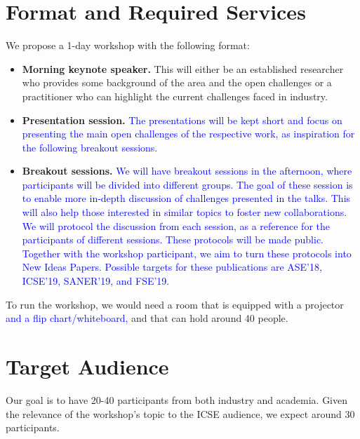 \documentclass[10pt, conference]{IEEEtran}
\newcommand{\updated}[1]{{\textcolor{blue}{#1}}}
\begin{document}
\section{Format and Required Services}

We propose a 1-day workshop with the following format:

\begin{itemize}
\setlength\itemsep{5pt}
\item \textbf{Morning keynote speaker.} This will either be an established researcher who provides some background of the area and the open challenges or a practitioner who can highlight the current challenges faced in industry.
\item \textbf{Presentation session.} \updated{The presentations will be kept short and focus on presenting the main open challenges of the respective work, as inspiration for the following breakout sessions.}

\item \textbf{Breakout sessions.} \updated{We will have breakout sessions in the afternoon, where participants will be divided into different groups. The goal of these session is to enable more in-depth discussion of challenges presented in the talks. This will also help those interested in similar topics to foster new collaborations. We will protocol the discussion from each session, as a reference for the participants of different sessions. These protocols will be made public. Together with the workshop participant, we aim to turn these protocols into New Ideas Papers. Possible targets for these publications are ASE'18, ICSE'19, SANER'19, and FSE'19.}
\end{itemize}

To run the workshop, we would need a room that is equipped with a projector \updated{and a flip chart/whiteboard,} and that can hold around 40 people.

\section{Target Audience}

Our goal is to have 20-40 participants from both industry and academia. Given the relevance of the workshop's topic to the ICSE audience, we expect around 30 participants.
\end{document}
